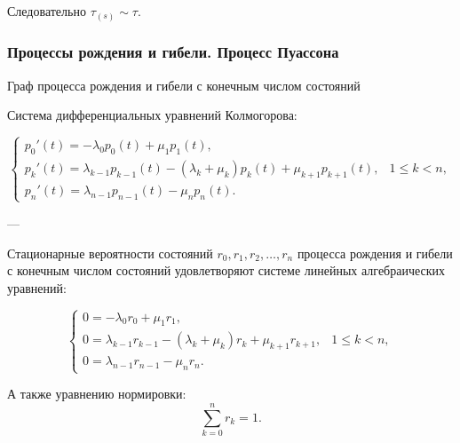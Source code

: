 Следовательно $\tau_{(s)} \sim \tau$.

\subsubsection*{Процессы рождения и гибели. Процесс Пуассона}

Граф процесса рождения и гибели с конечным числом состояний

\begin{center}
\end{center}

Система дифференциальных уравнений Колмогорова:

\[
	\begin{cases}
		p_0'(t) = -\lambda_0 p_0(t) + \mu_1 p_1(t), \\[4pt]
		p_k'(t) = \lambda_{k-1} p_{k-1}(t)
		- (\lambda_k + \mu_k) p_k(t)
		+ \mu_{k+1} p_{k+1}(t),
		 & 1 \le k < n,                             \\[4pt]
		p_n'(t) = \lambda_{n-1} p_{n-1}(t) - \mu_n p_n(t).
	\end{cases}
\]

---

Стационарные вероятности состояний $r_0, r_1, r_2, \ldots, r_n$ процесса рождения и гибели
с конечным числом состояний удовлетворяют системе линейных алгебраических уравнений:

\[
	\begin{cases}
		0 = -\lambda_0 r_0 + \mu_1 r_1, \\[4pt]
		0 = \lambda_{k-1} r_{k-1} - (\lambda_k + \mu_k) r_k + \mu_{k+1} r_{k+1},
		 & 1 \le k < n,                 \\[4pt]
		0 = \lambda_{n-1} r_{n-1} - \mu_n r_n.
	\end{cases}
\]

А также уравнению нормировки:
\[
	\sum_{k=0}^{n} r_k = 1.
\]